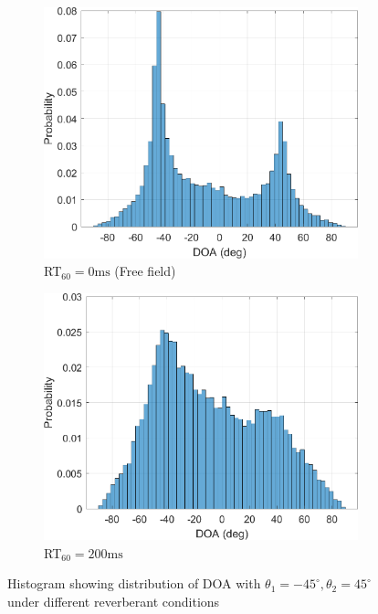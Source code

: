 \documentclass[a4paper,twoside,12pt,hidelinks]{article}
\begin{document}
\begin{figure}[H]
\centering
\begin{subfigure}[H]{0.49\textwidth}
\includegraphics[width=\textwidth]{doahistr0}
\caption{RT$_{60}=0\text{ms}$ (Free field)}
\end{subfigure}
\begin{subfigure}[H]{0.49\textwidth}
\includegraphics[width=\textwidth]{doahistr200}
\caption{RT$_{60}=200\text{ms}$}
\end{subfigure}
\caption{Histogram showing distribution of DOA with $\theta_1=-45^\circ, \theta_2=45^\circ$ under different reverberant conditions}
\label{fig:doahist}
\end{figure}
\end{document}
